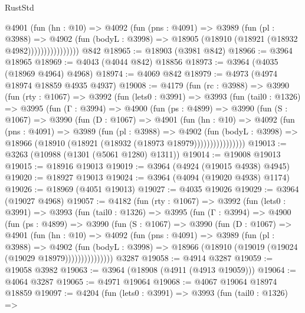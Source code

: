 \begin{lexlean}{RustStd}
\begin{coremodule}
                    @4901
                      (fun (hn : @10) =>
                      @4092
                        (fun (pns : @4091) =>
                        @3989
                          (fun (pl : @3988) =>
                          @4902
                            (fun (bodyL : @3998) =>
                            @18905 (@18910 (@18921 (@18932 @4982))))))))))))))))
    @842
@18965 := @18903 (@3981 @842)
@18966 := @3964 @18965
@18969 := @4043 (@4044 @842) @18856
@18973 := @3964 (@4035 (@18969 @4964) @4968)
@18974 := @4069 @842
@18979 := @4973 (@4974 @18974 @18859 @4935 @4937)
@19008 := @4179
    (fun (rc : @3988) =>
    @3990
      (fun (rty : @1067) =>
      @3992
        (fun (lets0 : @3991) =>
        @3993
          (fun (tail0 : @1326) =>
          @3995
            (fun (Γ : @3994) =>
            @4900
              (fun (ps : @4899) =>
              @3990
                (fun (S : @1067) =>
                @3990
                  (fun (D : @1067) =>
                  @4901
                    (fun (hn : @10) =>
                    @4092
                      (fun (pns : @4091) =>
                      @3989
                        (fun (pl : @3988) =>
                        @4902
                          (fun (bodyL : @3998) =>
                          @18966 (@18910 (@18921 (@18932 (@18973 @18979))))))))))))))))
@19013 := @3263 (@10988 (@1301 (@5061 @1280) @1311))
@19014 := @19008 @19013
@19015 := @18916 @19013
@19019 := @3964 (@4924 (@19015 @4938) @4945)
@19020 := @18927 @19013
@19024 := @3964 (@4094 (@19020 @4938) @1174)
@19026 := @18969 (@4051 @19013)
@19027 := @4035 @19026
@19029 := @3964 (@19027 @4968)
@19057 := @4182
    (fun (rty : @1067) =>
    @3992
      (fun (lets0 : @3991) =>
      @3993
        (fun (tail0 : @1326) =>
        @3995
          (fun (Γ : @3994) =>
          @4900
            (fun (ps : @4899) =>
            @3990
              (fun (S : @1067) =>
              @3990
                (fun (D : @1067) =>
                @4901
                  (fun (hn : @10) =>
                  @4092
                    (fun (pns : @4091) =>
                    @3989
                      (fun (pl : @3988) =>
                      @4902
                        (fun (bodyL : @3998) =>
                        @18966 (@18910 (@19019 (@19024 (@19029 @18979)))))))))))))))
    @3287
@19058 := @4914 @3287
@19059 := @19058 @3982
@19063 := @3964 (@18908 (@4911 (@4913 @19059)))
@19064 := @4064 @3287
@19065 := @4971 @19064
@19068 := @4067 @19064 @18974 @18859
@19097 := @4204
    (fun (lets0 : @3991) =>
    @3993
      (fun (tail0 : @1326) =>

\end{coremodule}
\end{lexlean}
